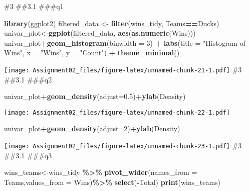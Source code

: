 \documentclass[
]{article}
\newenvironment{Shaded}{\begin{snugshade}}{\end{snugshade}}
\newcommand{\AttributeTok}[1]{\textcolor[rgb]{0.13,0.29,0.53}{#1}}
\newcommand{\DecValTok}[1]{\textcolor[rgb]{0.00,0.00,0.81}{#1}}
\newcommand{\FloatTok}[1]{\textcolor[rgb]{0.00,0.00,0.81}{#1}}
\newcommand{\FunctionTok}[1]{\textcolor[rgb]{0.13,0.29,0.53}{\textbf{#1}}}
\newcommand{\NormalTok}[1]{#1}
\newcommand{\OtherTok}[1]{\textcolor[rgb]{0.56,0.35,0.01}{#1}}
\newcommand{\SpecialCharTok}[1]{\textcolor[rgb]{0.81,0.36,0.00}{\textbf{#1}}}
\newcommand{\StringTok}[1]{\textcolor[rgb]{0.31,0.60,0.02}{#1}}
\begin{document}
\#3 \#\#3.1 \#\#\#q1

\begin{Shaded}
\begin{Highlighting}[]
\FunctionTok{library}\NormalTok{(ggplot2)}
\NormalTok{filtered\_data }\OtherTok{\textless{}{-}} \FunctionTok{filter}\NormalTok{(wins\_tidy, Teams}\SpecialCharTok{==}\StringTok{\textquotesingle{}Ducks\textquotesingle{}}\NormalTok{)}
\NormalTok{univar\_plot}\OtherTok{\textless{}{-}}\FunctionTok{ggplot}\NormalTok{(filtered\_data, }\FunctionTok{aes}\NormalTok{(}\FunctionTok{as.numeric}\NormalTok{(Wins)))}
\NormalTok{univar\_plot}\SpecialCharTok{+}\FunctionTok{geom\_histogram}\NormalTok{(}\AttributeTok{binwidth =} \DecValTok{3}\NormalTok{) }\SpecialCharTok{+}
  \FunctionTok{labs}\NormalTok{(}\AttributeTok{title =} \StringTok{"Histogram of Wins"}\NormalTok{,}
       \AttributeTok{x =} \StringTok{"Wins"}\NormalTok{,}
       \AttributeTok{y =} \StringTok{"Count"}\NormalTok{) }\SpecialCharTok{+}
  \FunctionTok{theme\_minimal}\NormalTok{()}
\end{Highlighting}
\end{Shaded}

\texttt{[image: Assignment02\_files/figure-latex/unnamed-chunk-21-1.pdf]}
\#3 \#\#3.1 \#\#\#q2

\begin{Shaded}
\begin{Highlighting}[]
\NormalTok{univar\_plot}\SpecialCharTok{+}\FunctionTok{geom\_density}\NormalTok{(}\AttributeTok{adjust=}\FloatTok{0.5}\NormalTok{)}\SpecialCharTok{+}\FunctionTok{ylab}\NormalTok{(}\StringTok{\textquotesingle{}Density\textquotesingle{}}\NormalTok{)}
\end{Highlighting}
\end{Shaded}

\texttt{[image: Assignment02\_files/figure-latex/unnamed-chunk-22-1.pdf]}

\begin{Shaded}
\begin{Highlighting}[]
\NormalTok{univar\_plot}\SpecialCharTok{+}\FunctionTok{geom\_density}\NormalTok{(}\AttributeTok{adjust=}\DecValTok{2}\NormalTok{)}\SpecialCharTok{+}\FunctionTok{ylab}\NormalTok{(}\StringTok{\textquotesingle{}Density\textquotesingle{}}\NormalTok{)}
\end{Highlighting}
\end{Shaded}

\texttt{[image: Assignment02\_files/figure-latex/unnamed-chunk-23-1.pdf]}
\#3 \#\#3.1 \#\#\#q3

\begin{Shaded}
\begin{Highlighting}[]
\NormalTok{wins\_teams}\OtherTok{\textless{}{-}}\NormalTok{wins\_tidy }\SpecialCharTok{\%\textgreater{}\%}
  \FunctionTok{pivot\_wider}\NormalTok{(}\AttributeTok{names\_from =}\NormalTok{ Teams,}\AttributeTok{values\_from =}\NormalTok{ Wins)}\SpecialCharTok{\%\textgreater{}\%}
  \FunctionTok{select}\NormalTok{(}\SpecialCharTok{{-}}\NormalTok{Total)}
\FunctionTok{print}\NormalTok{(wins\_teams)}
\end{Highlighting}
\end{Shaded}
\end{document}
